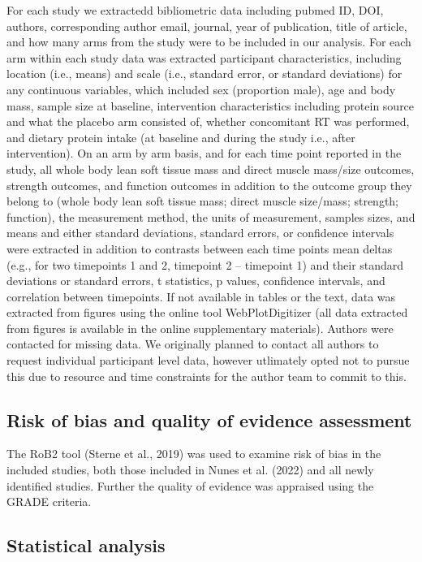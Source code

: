 \documentclass[
]{article}
\begin{document}
For each study we extractedd bibliometric data including pubmed ID, DOI,
authors, corresponding author email, journal, year of publication, title
of article, and how many arms from the study were to be included in our
analysis. For each arm within each study data was extracted participant
characteristics, including location (i.e., means) and scale (i.e.,
standard error, or standard deviations) for any continuous variables,
which included sex (proportion male), age and body mass, sample size at
baseline, intervention characteristics including protein source and what
the placebo arm consisted of, whether concomitant RT was performed, and
dietary protein intake (at baseline and during the study i.e., after
intervention). On an arm by arm basis, and for each time point reported
in the study, all whole body lean soft tissue mass and direct muscle
mass/size outcomes, strength outcomes, and function outcomes in addition
to the outcome group they belong to (whole body lean soft tissue mass;
direct muscle size/mass; strength; function), the measurement method,
the units of measurement, samples sizes, and means and either standard
deviations, standard errors, or confidence intervals were extracted in
addition to contrasts between each time points mean deltas (e.g., for
two timepoints 1 and 2, timepoint 2 -- timepoint 1) and their standard
deviations or standard errors, t statistics, p values, confidence
intervals, and correlation between timepoints. If not available in
tables or the text, data was extracted from figures using the online
tool WebPlotDigitizer (all data extracted from figures is available in
the online supplementary materials). Authors were contacted for missing
data. We originally planned to contact all authors to request individual
participant level data, however utlimately opted not to pursue this due
to resource and time constraints for the author team to commit to this.

\subsection{Risk of bias and quality of evidence
assessment}\label{risk-of-bias-and-quality-of-evidence-assessment}

The RoB2 tool (Sterne et al., 2019) was used to examine risk of bias in
the included studies, both those included in Nunes et al. (2022) and all
newly identified studies. Further the quality of evidence was appraised
using the GRADE criteria.

\subsection{Statistical analysis}\label{statistical-analysis}
\end{document}
